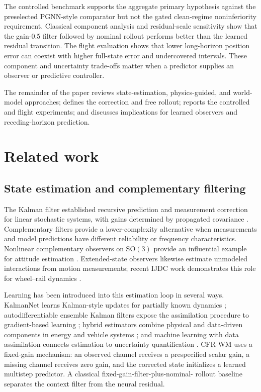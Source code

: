 \documentclass[iicol,pdflatex,sn-basic,Numbered]{sn-jnl}
\begin{document}
The controlled benchmark supports the aggregate primary hypothesis against the
preselected PGNN-style comparator but not the gated clean-regime noninferiority
requirement. Classical component analysis and residual-scale sensitivity show
that the gain-0.5 filter followed by nominal rollout performs better than the
learned residual transition. The flight
evaluation shows that lower long-horizon position error can coexist with higher
full-state error and undercovered intervals. These component and uncertainty
trade-offs matter when a predictor supplies an observer or predictive
controller.

The remainder of the paper reviews state-estimation, physics-guided, and world-
model approaches; defines the correction and free rollout; reports the
controlled and flight experiments; and discusses implications for learned
observers and receding-horizon prediction.

\section{Related work}

\subsection{State estimation and complementary filtering}

The Kalman filter established recursive prediction and measurement correction
for linear stochastic systems, with gains determined by propagated covariance
\cite{kalman1960_filtering}. Complementary filters provide a lower-complexity
alternative when measurements and model predictions have different reliability
or frequency characteristics. Nonlinear complementary observers on
$\mathrm{SO}(3)$ provide an influential example for attitude estimation
\cite{mahony2008_complementary}. Extended-state observers likewise estimate
unmodeled interactions from motion measurements; recent IJDC work demonstrates
this role for wheel--rail dynamics \cite{zhao2023_wheel_rail_observer}.

Learning has been introduced into this estimation loop in several ways.
KalmanNet learns Kalman-style updates for partially known dynamics
\cite{revach2022_kalmannet}; autodifferentiable ensemble Kalman filters expose
the assimilation procedure to gradient-based learning
\cite{chen2022_autodifferentiable_enkf}; hybrid estimators combine physical and data-driven
components in energy and vehicle systems
\cite{chen2022_hybrid_physics_data_driven_online,chen2023_hybrid_physics_and_data_driven};
and machine learning with data assimilation connects estimation to uncertainty
quantification \cite{cheng2023_machine_learning_with_data_assimilation}. CFR-WM
uses a fixed-gain mechanism: an observed channel receives a prespecified scalar
gain, a missing channel receives zero gain, and the corrected state initializes
a learned multistep predictor. A classical fixed-gain-filter-plus-nominal-
rollout baseline separates the context filter from the neural residual.
\end{document}
